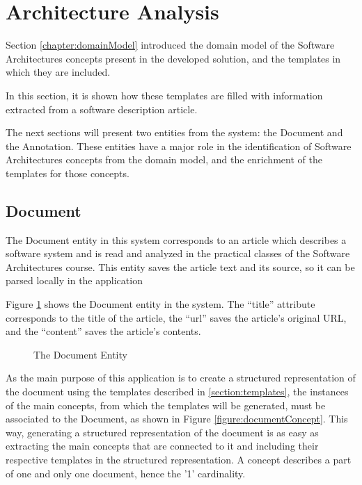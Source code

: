 
\section{Architecture Analysis}
\label{chapter:architecture}
Section \ref{chapter:domainModel} introduced the domain model of the Software Architectures concepts present in the developed solution, and the templates in which they are included.

In this section, it is shown how these templates are filled with information extracted from a software description article.

The next sections will present two entities from the system: the Document and the Annotation. These entities have a major role in the identification of Software Architectures concepts from the domain model, and the enrichment of the templates for those concepts.

\subsection{Document}
\label{section:document}

The Document entity in this system corresponds to an article which describes a software system and is read and analyzed in the practical classes of the Software Architectures course. This entity saves the article text and its source, so it can be parsed locally in the application

Figure \ref{figure:documentEntity} shows the Document entity in the system. The ``title'' attribute corresponds to the title of the article, the ``url'' saves the article's original URL, and the ``content'' saves the article's contents.

\begin{figure}[h]
\centering
\renewcommand {\umltextcolor}{black}
\renewcommand {\umlfillcolor}{none}
\renewcommand {\umldrawcolor}{black}

\caption{The Document Entity}
\label{figure:documentEntity}
\end{figure}

As the main purpose of this application is to create a structured representation of the document using the templates described in \ref{section:templates}, the instances of the main concepts, from which the templates will be generated, must be associated to the Document, as shown in Figure \ref{figure:documentConcept}. This way, generating a structured representation of the document is as easy as extracting the main concepts that are connected to it and including their respective templates in the structured representation. A concept describes a part of one and only one document, hence the '1' cardinality.  

